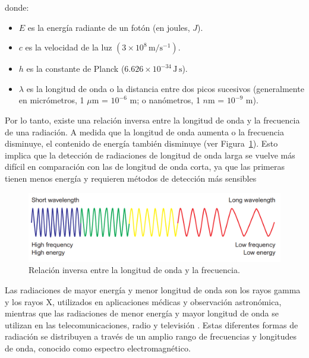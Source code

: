donde:

\begin{itemize}
    \item $E$ es la energía radiante de un fotón (en joules, $J$).
    \item $c$ es la velocidad de la luz $(3 \times 10^8 \, \mathrm{m/s^{-1}})$.
    \item $h$ es la constante de Planck (\(6.626 \times 10^{-34} \, \mathrm{J \, s}\)).
    \item \(\lambda\) es la longitud de onda o la distancia entre dos picos sucesivos (generalmente en micrómetros, 1 $\mu$m = \(10^{-6}\) m; o nanómetros, 1 $n$m = \(10^{-9}\) m).
\end{itemize}

Por lo tanto, existe una relación inversa entre la longitud de onda y la frecuencia de una radiación. A medida que la longitud de onda aumenta o la frecuencia disminuye, el contenido de energía también disminuye (ver Figura~\ref{fig:RelacionLongitudOnda}). Esto implica que la detección de radiaciones de longitud de onda larga se vuelve más difícil en comparación con las de longitud de onda corta, ya que las primeras tienen menos energía y requieren métodos de detección más sensibles \cite{chuvieco2016fundamentals}

\begin{figure}[H]
    \begin{center}
        \includegraphics[width=1\textwidth]{Images/RelacionLongitudOnda.png}
    \end{center}
    \caption{Relación inversa entre la longitud de onda y la frecuencia.}
    \label{fig:RelacionLongitudOnda}
\end{figure}

Las radiaciones de mayor energía y menor longitud de onda son los rayos gamma y los rayos X, utilizados en aplicaciones médicas y observación astronómica, mientras que las radiaciones de menor energía y mayor longitud de onda se utilizan en las telecomunicaciones, radio y televisión \cite{chuvieco2016fundamentals}. Estas diferentes formas de radiación se distribuyen a través de un amplio rango de frecuencias y longitudes de onda, conocido como espectro electromagnético.

